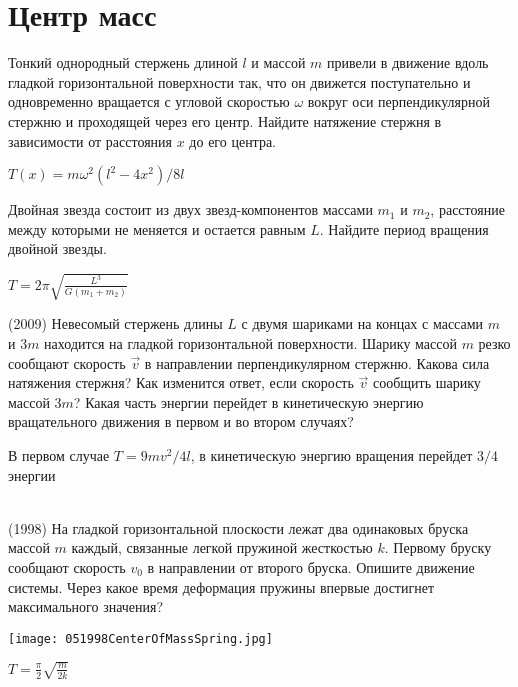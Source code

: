 \section{Центр масс}
\begin{ex}
Тонкий однородный стержень длиной $l$ и массой $m$ привели в движение вдоль гладкой горизонтальной поверхности так, что он движется поступательно и одновременно вращается с угловой скоростью $\omega$ вокруг оси перпендикулярной стержню и проходящей через его центр. Найдите натяжение стержня в зависимости от расстояния $x$ до его центра.
\begin{ans}
$T(x) = m \omega^2 \left( l^2 - 4x^2 \right)/8l$
\end{ans}
\end{ex}

\begin{ex}
Двойная звезда состоит из двух звезд-компонентов массами $m_1$ и $m_2$, расстояние между которыми не меняется и остается равным $L$. Найдите период вращения двойной звезды.
\begin{ans}
$T = 2 \pi \sqrt{\frac{L^3}{G(m_1+m_2)}}$ 
\end{ans}
\end{ex}

\begin{ex}
(2009) Невесомый стержень длины $L$ с двумя шариками на концах с массами $m$ и $3m$ находится на гладкой горизонтальной поверхности. Шарику массой $m$ резко сообщают скорость $\vec v$ в направлении перпендикулярном стержню. Какова сила натяжения стержня? Как изменится ответ, если скорость $\vec v$ сообщить шарику массой $3m$? Какая часть энергии перейдет в кинетическую энергию вращательного движения в первом и во втором случаях?
\begin{ans}
В первом случае $T = 9mv^2 / 4l$, в кинетическую энергию вращения перейдет $3/4$ энергии
\end{ans}
\end{ex}

\begin{ex}
\hspace{0pt} \\
(1998) На гладкой горизонтальной плоскости лежат два одинаковых бруска массой $m$ каждый, связанные легкой пружиной жесткостью $k$. Первому бруску сообщают скорость $v_0$ в направлении от второго бруска. Опишите движение системы. Через какое время деформация пружины впервые достигнет максимального значения? 
\begin{center}
\texttt{[image: 051998CenterOfMassSpring.jpg]}
\end{center}
\begin{ans}
$T = \frac{\pi}{2}\sqrt{\frac{m}{2k}}$
\end{ans}
\end{ex}

